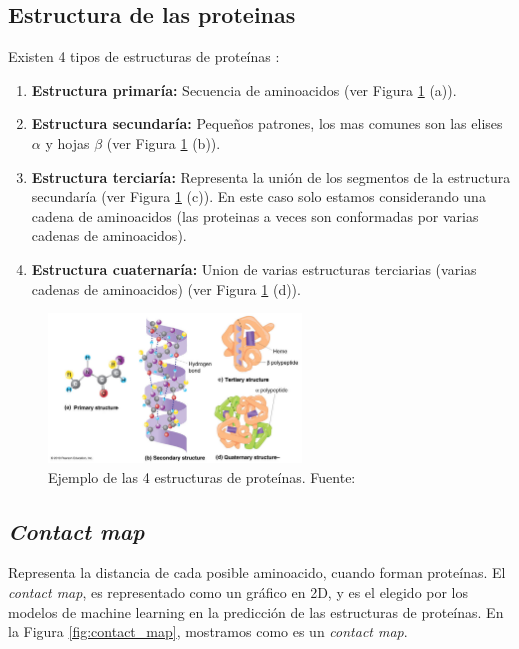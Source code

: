\documentclass{article}
\begin{document}
	\subsection{Estructura de las proteinas}
	
	Existen 4 tipos de estructuras de proteínas \citep{russell2002igenetics}:
	
	\begin{enumerate}
		\item \textbf{Estructura primaría:} Secuencia de aminoacidos (ver Figura \ref{fig:protein_structure} (a)).
		\item \textbf{Estructura secundaría:} Pequeños patrones, los mas comunes son las elises $\alpha$ y hojas $\beta$ (ver Figura \ref{fig:protein_structure} (b)).
		\item \textbf{Estructura terciaría:} Representa la unión de los segmentos de la estructura secundaría (ver Figura \ref{fig:protein_structure} (c)). En este caso solo estamos considerando una cadena de aminoacidos (las proteinas a veces son conformadas por varias cadenas de aminoacidos).
		\item \textbf{Estructura cuaternaría:} Union de varias estructuras terciarias (varias cadenas de aminoacidos) (ver Figura \ref{fig:protein_structure} (d)).
	\end{enumerate}
	
	
	\begin{figure}
		\centering
		\includegraphics[width=0.6\textwidth]{img/papers/protein_structure}
		\caption{Ejemplo de las 4 estructuras de proteínas. Fuente: \citep{russell2002igenetics}}
		\label{fig:protein_structure}
	\end{figure}
	
	
	\subsection{\textit{Contact map}}
	
	Representa la distancia de cada posible aminoacido, cuando forman proteínas. El \textit{contact map}, es representado como un gráfico en 2D, y es el elegido por los modelos de machine learning en la predicción de las estructuras de proteínas. En la Figura \ref{fig:contact_map}, mostramos como es un \textit{contact map}.
	
\end{document}

